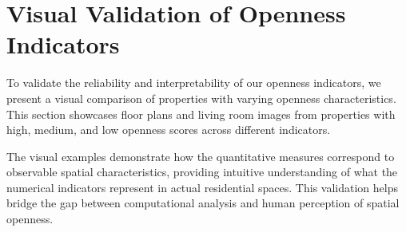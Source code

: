 

\section{Visual Validation of Openness Indicators}

To validate the reliability and interpretability of our openness indicators, we present a visual 
comparison of properties with varying openness characteristics. This section showcases floor plans 
and living room images from properties with high, medium, and low openness scores across different 
indicators.

The visual examples demonstrate how the quantitative measures correspond to observable spatial 
characteristics, providing intuitive understanding of what the numerical indicators represent in 
actual residential spaces. This validation helps bridge the gap between computational analysis and 
human perception of spatial openness.
